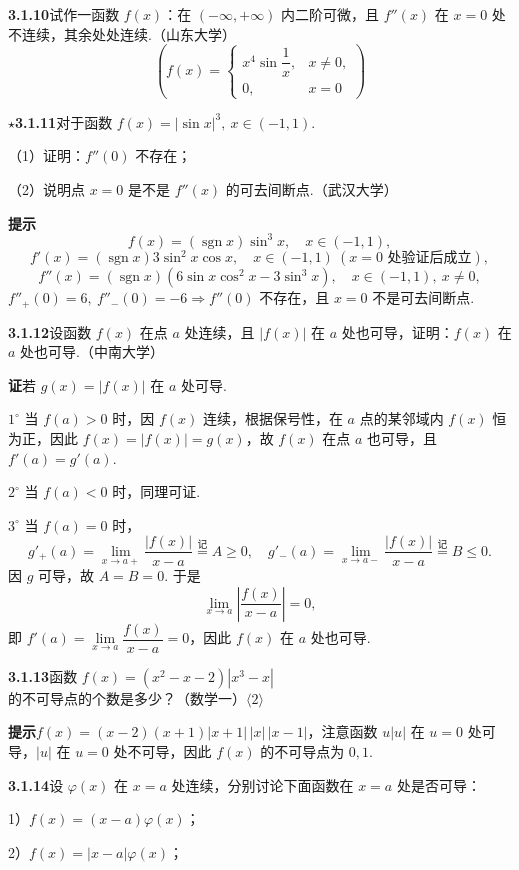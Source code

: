 \documentclass[UTF8,12pt,a4paper,fontset=fandol]{ctexart}
\begin{document}
\noindent\textbf{3.1.10}\quad 试作一函数 $f(x)$：在 $(-\infty,+\infty)$ 内二阶可微，且 $f''(x)$ 在 $x=0$ 处不连续，其余处处连续.（山东大学）
\[
  \left(f(x)=
\begin{cases}
x^4\sin\dfrac1x, & x\ne0,\\
0, & x=0
\end{cases}\right)
\]

\noindent\textbf{$\star$3.1.11}\quad 对于函数 $f(x)=|\sin x|^3,\ x\in(-1,1)$.

（1）证明：$f''(0)$ 不存在；

（2）说明点 $x=0$ 是不是 $f''(x)$ 的可去间断点.（武汉大学）

\noindent\textbf{提示}\quad
\[
  f(x)=(\operatorname{sgn}x)\sin^3x,\quad x\in(-1,1),
\]
\[
  f'(x)=(\operatorname{sgn}x)3\sin^2x\cos x,\quad x\in(-1,1)\ (x=0\text{ 处验证后成立}),
\]
\[
  f''(x)=(\operatorname{sgn}x)(6\sin x\cos^2x-3\sin^3x),\quad x\in(-1,1),\ x\ne0,
\]
$f''_+(0)=6,\ f''_-(0)=-6\Rightarrow f''(0)$ 不存在，且 $x=0$ 不是可去间断点.

\noindent\textbf{3.1.12}\quad 设函数 $f(x)$ 在点 $a$ 处连续，且 $|f(x)|$ 在 $a$ 处也可导，证明：$f(x)$ 在 $a$ 处也可导.（中南大学）

\noindent\textbf{证}\quad 若 $g(x)=|f(x)|$ 在 $a$ 处可导.

$1^\circ$ 当 $f(a)>0$ 时，因 $f(x)$ 连续，根据保号性，在 $a$ 点的某邻域内 $f(x)$ 恒为正，因此 $f(x)=|f(x)|=g(x)$，故 $f(x)$ 在点 $a$ 也可导，且 $f'(a)=g'(a)$.

$2^\circ$ 当 $f(a)<0$ 时，同理可证.

$3^\circ$ 当 $f(a)=0$ 时，
\[
  g'_+(a)=\lim_{x\to a+}\frac{|f(x)|}{x-a}\stackrel{\text{记}}{=}A\ge0,\quad
  g'_-(a)=\lim_{x\to a-}\frac{|f(x)|}{x-a}\stackrel{\text{记}}{=}B\le0.
\]
因 $g$ 可导，故 $A=B=0$. 于是
\[
  \lim_{x\to a}\left|\frac{f(x)}{x-a}\right|=0,
\]
即 $f'(a)=\lim\limits_{x\to a}\dfrac{f(x)}{x-a}=0$，因此 $f(x)$ 在 $a$ 处也可导.

\noindent\textbf{3.1.13}\quad 函数 $f(x)=(x^2-x-2)|x^3-x|$ 的不可导点的个数是多少？（数学一）\quad $\langle2\rangle$

\noindent\textbf{提示}\quad $f(x)=(x-2)(x+1)|x+1|\,|x|\,|x-1|$，注意函数 $u|u|$ 在 $u=0$ 处可导，$|u|$ 在 $u=0$ 处不可导，因此 $f(x)$ 的不可导点为 $0,1$.

\noindent\textbf{3.1.14}\quad 设 $\varphi(x)$ 在 $x=a$ 处连续，分别讨论下面函数在 $x=a$ 处是否可导：

1）$f(x)=(x-a)\varphi(x)$；

2）$f(x)=|x-a|\varphi(x)$；
\end{document}
